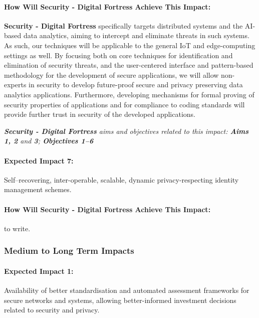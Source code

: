 \documentclass[a4paper,11pt]{article}
\newcommand{\project}[1]{\textbf{#1}\xspace}
\newcommand{\SECURITY}{\project{Security - Digital Fortress}}
\newcommand{\TheProject}{\SECURITY}
\begin{document}
\begin{mdframed}[backgroundcolor=gray!10]
\paragraph{How Will \TheProject{} Achieve This Impact:}
\TheProject{} specifically targets distributed systems and the AI-based data analytics, aiming to intercept and eliminate threats in such systems. As such, our techniques will be applicable to the general IoT and edge-computing settings as well. By focusing both on core techniques for identification and elimination of security threats, and the user-centered interface and pattern-based methodology for the development of secure applications, we will allow non-experts in security to develop future-proof secure and privacy preserving data analytics applications. Furthermore, developing mechanisms for formal proving of security properties of applications and for compliance to coding standards will provide further trust in security of the developed applications.

\emph{\TheProject{} aims and objectives related to this impact: \textbf{Aims 1, 2}  and \textbf{3}; \textbf{Objectives 1--6} }

\end{mdframed}

\begin{mdframed}[backgroundcolor=blue!5]
\paragraph{Expected Impact 7:}
Self–recovering, inter-operable, scalable, dynamic privacy-respecting identity management schemes.
\end{mdframed}

\begin{mdframed}[backgroundcolor=gray!10]
\paragraph{How Will \TheProject{} Achieve This Impact:}
\COGNI to write.
\end{mdframed}

\subsubsection{Medium to Long Term Impacts}

\begin{mdframed}[backgroundcolor=blue!5]
\paragraph{Expected Impact 1:}
Availability of better standardisation and automated assessment frameworks for secure networks and systems, allowing better-informed investment decisions related to security and privacy.
\end{mdframed}
\end{document}
